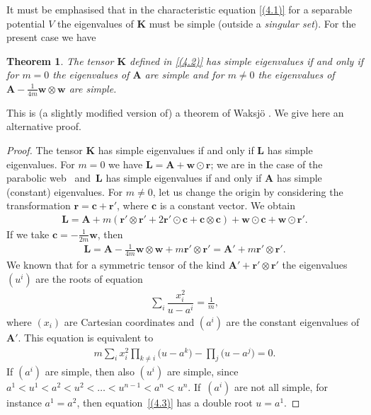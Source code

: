 \documentclass[10pt,a4paper]{amsart}
\def\bs{\boldsymbol}
\numberwithin{equation}{section}
\newtheorem{Theorem}{Theorem}[section]
 { \theoremstyle{definition}
\newtheorem{Notation}[Theorem]{Notation}
\newtheorem{Example}[Theorem]{Example}
\newtheorem{Remark}[Theorem]{Remark}
\newtheorem{Remarks}[Theorem]{Remarks}
 }
\begin{document}
It must be emphasised that in the characteristic equation \eqref{(4.1)} for a separable potential $V$ the eigenvalues of $\bs K$ must be simple (outside a {\it singular set}). For the present case we have

\begin{Theorem}\label{t:4.4}
The tensor $\bs K$ defined in \eqref{(4.2)} has simple eigenvalues if and only if for $m=0$ the eigenvalues of $\bs A$ are simple and for $m\neq 0$ the eigenvalues of $\bs A-\tfrac 1{4m} \bs w\otimes\bs w$
are simple.
\end{Theorem}

This is (a slightly modif\/ied version of) a theorem of Waksj\"o \cite[p.~45]{Waksjo-2000}. We give here an alternative proof.

\begin{proof}
The tensor $\bs K$ has simple eigenvalues if and only if $\bs L$ has simple eigenvalues.
For $m=0$ we have $\bs L=\bs A+\bs w\odot \bs r$; we are in the case of the parabolic web~\cite{Benenti-1992b} and~$\bs L$ has simple eigenvalues if and only if $\bs A$ has simple (constant) eigenvalues.
For $m\neq 0$, let us change the origin by considering the transformation $\bs r=\bs c+\bs r'$,
where $\bs c$ is a constant vector. We obtain
\begin{gather*}
\bs L=\bs A+m  (\bs r'\otimes \bs r'+2 \bs r'\odot\bs c+\bs c\otimes\bs c)+
\bs w\odot \bs c +\bs w\odot\bs r'.
\end{gather*}
If we take $\bs c= -\tfrac 1{2m} \bs w$, then
\begin{gather*}
\bs L=\bs A-\tfrac 1{4m}   \bs w\otimes\bs w + m  \bs r'\otimes \bs r'=\bs A'+m  \bs r'\otimes \bs r'.
\end{gather*}
We known that for a symmetric tensor of the kind $\bs A'+\bs r'\otimes\bs r'$ the eigenvalues $(u^i)$
are the roots of equation
\begin{gather*}
\sum_i\dfrac{x_i^2}{u-a^i}=\frac 1m,
\end{gather*}
where $(x_i)$ are Cartesian coordinates and $(a^i)$ are the constant eigenvalues of $\bs A'$.
This equation is equivalent to
\begin{gather}
m \sum_i x_i^2 \prod_{k\neq i} \big(u-a^k\big)- \prod_j\big(u-a^j\big)=0.
\label{(4.3)}
\end{gather}
If $(a^i)$ are simple, then also $(u^i)$ are simple, since $a^1< u^1 < a^2 < u^2 < \ldots < u^{n-1} < a^n < u^n$. If~$(a^i)$ are not all simple, for instance $a^1=a^2$, then equation~\eqref{(4.3)} has a double root $u=a^1$.
\end{proof}
\end{document}
